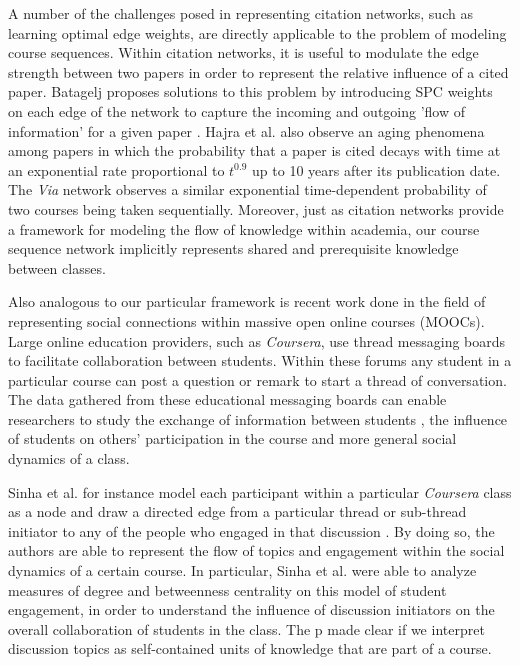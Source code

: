 \documentclass{sigchi}
\begin{document}
A number of the challenges posed in representing citation networks, such as learning optimal edge weights, are directly applicable to the problem of modeling course sequences. Within citation networks, it is useful to modulate the edge strength between two papers in order to represent the relative influence of a cited paper. Batagelj proposes solutions to this problem by introducing SPC weights on each edge of the network to capture the incoming and outgoing 'flow of information' for a given paper \cite{Batagelj2003}. Hajra et al. also observe an aging phenomena among papers in which the probability that a paper is cited decays with time at an exponential rate proportional to $t^{0.9}$ up to 10 years after its publication date. The {\em Via} network observes a similar exponential time-dependent probability of two courses being taken sequentially. Moreover, just as citation networks provide a framework for modeling the flow of knowledge within academia, our course sequence network implicitly represents shared and prerequisite knowledge between classes. 

Also analogous to our particular framework is recent work done in the field of representing social connections within massive open online courses (MOOCs). Large online education providers, such as \textit{Coursera}, use thread messaging boards to facilitate collaboration between students. Within these forums any student in a particular course can post a question or remark to start a thread of conversation. The data gathered from these educational messaging boards can enable researchers to study the exchange of information between students \cite{Brinton2016}, the influence of students on others' participation in the course \cite{Sinha2014a} and more general social dynamics of a class.

Sinha et al. for instance model each participant within a particular \textit{Coursera} class as a node and draw a directed edge from a particular thread or sub-thread initiator to any of the people who engaged in that discussion \cite{Sinha2014}. By doing so, the authors are able to represent the flow of topics and engagement within the social dynamics of a certain course. In particular, Sinha et al. were able to analyze measures of degree and betweenness centrality on this model of student engagement, in order to understand the influence of discussion initiators on the overall collaboration of students in the class. The p made clear if we interpret discussion topics as self-contained units of knowledge that are part of a course. 
\end{document}
